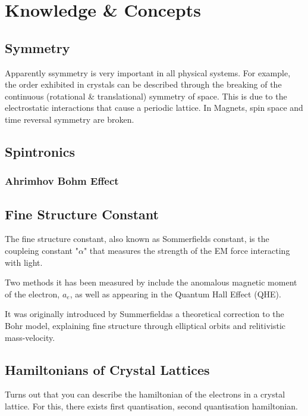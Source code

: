 \documentclass{article} %
\begin{document}
\section{}


\section{Knowledge \& Concepts}
\subsection{Symmetry}
Apparently ssymmetry is very important in all physical systems. 
For example, the order exhibited in crystals can be described through the breaking of the continuous (rotational \& translational) symmetry of space. This is due to the electrostatic interactions that cause a periodic lattice. In Magnets, spin space and time reversal symmetry are broken.
%


\subsection{Spintronics}
\subsubsection{Ahrimhov Bohm Effect}

\subsection{Fine Structure Constant}
The fine structure constant, also known as Sommerfields constant, is the coupleing constant "$\alpha$" that measures the strength of the EM force interacting with light.

Two methods it has been measured by include the anomalous magnetic moment of the electron, $a_e$, as well as appearing in the Quantum Hall Effect (QHE). 

It was originally introduced by Summerfieldas a theoretical correction to the Bohr  model, explaining fine structure through elliptical orbits and relitivistic mass-velocity. 

\subsection{Hamiltonians of Crystal Lattices}
Turns out that you can describe the hamiltonian of the electrons in a crystal lattice.  For this, there exists first quantisation, second quantisation hamiltonian.
\end{document}
